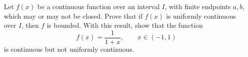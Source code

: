 \begin{exercise}
  \label{ex:hw05:uniform-continuity-boundedness}
  Let $f(x)$ be a continuous function over an interval $I$, with finite
  endpoints $a,b$, which may or may not be closed. Prove that if $f(x)$
  is uniformly continuous over $I$, then $f$ is bounded. With this
  result, show that the function
  \[
    f(x)=\frac{1}{1+x},\qquad x\in(-1,1)
  \]
  is continuous but not uniformly continuous.
\end{exercise}
